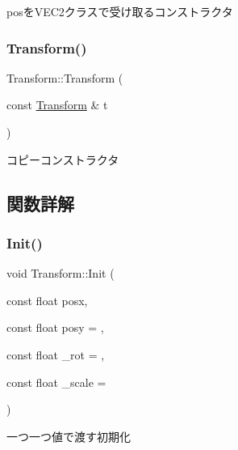 posを\+V\+E\+C2クラスで受け取るコンストラクタ 

\mbox{\label{class_transform_a7790f3c5dfe2b7fe7997af5f23e2ec7d}} 
\subsubsection{\texorpdfstring{Transform()}{Transform()}\hspace{0.1cm}{\footnotesize\ttfamily [4/4]}}
{\footnotesize\ttfamily Transform\+::\+Transform (\begin{DoxyParamCaption}\item[{const \mbox{\hyperlink{class_transform}{Transform}} \&}]{t }\end{DoxyParamCaption})}



コピーコンストラクタ 



\subsection{関数詳解}
\mbox{\label{class_transform_a39816379bc1e3a0bbae23fa94db576f1}} 
\subsubsection{\texorpdfstring{Init()}{Init()}\hspace{0.1cm}{\footnotesize\ttfamily [1/3]}}
{\footnotesize\ttfamily void Transform\+::\+Init (\begin{DoxyParamCaption}\item[{const float}]{posx,  }\item[{const float}]{posy = {},  }\item[{const float}]{\+\_\+rot = {},  }\item[{const float}]{\+\_\+scale = {} }\end{DoxyParamCaption})}



一つ一つ値で渡す初期化 

\mbox{\label{class_transform_a0ccfc45e47071b7ebed1a61a14a202c4}} 
